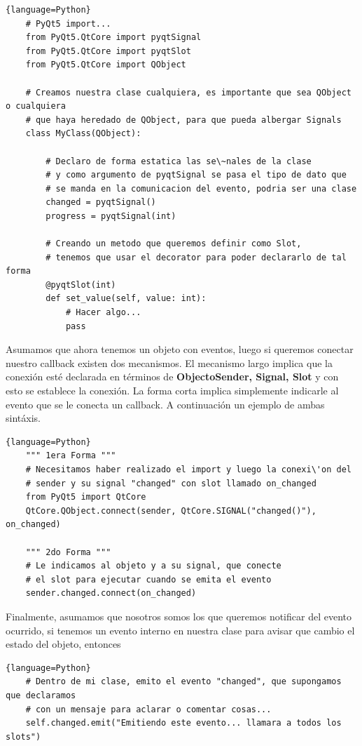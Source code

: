 \begin{lstlisting}{language=Python}
    # PyQt5 import...
    from PyQt5.QtCore import pyqtSignal
    from PyQt5.QtCore import pyqtSlot
    from PyQt5.QtCore import QObject

    # Creamos nuestra clase cualquiera, es importante que sea QObject o cualquiera
    # que haya heredado de QObject, para que pueda albergar Signals
    class MyClass(QObject):

        # Declaro de forma estatica las se\~nales de la clase
        # y como argumento de pyqtSignal se pasa el tipo de dato que
        # se manda en la comunicacion del evento, podria ser una clase
        changed = pyqtSignal()
        progress = pyqtSignal(int)

        # Creando un metodo que queremos definir como Slot,
        # tenemos que usar el decorator para poder declararlo de tal forma
        @pyqtSlot(int)
        def set_value(self, value: int):
            # Hacer algo...
            pass
\end{lstlisting}

Asumamos que ahora tenemos un objeto con eventos, luego si queremos conectar nuestro callback existen dos mecanismos. El mecanismo largo implica
que la conexi\'on est\'e declarada en t\'erminos de \textbf{ObjectoSender, Signal, Slot} y con esto se establece la conexi\'on. La forma corta implica simplemente indicarle al evento
que se le conecta un callback. A continuaci\'on un ejemplo de ambas sint\'axis.

\begin{lstlisting}{language=Python}
    """ 1era Forma """
    # Necesitamos haber realizado el import y luego la conexi\'on del
    # sender y su signal "changed" con slot llamado on_changed
    from PyQt5 import QtCore
    QtCore.QObject.connect(sender, QtCore.SIGNAL("changed()"), on_changed)

    """ 2do Forma """
    # Le indicamos al objeto y a su signal, que conecte
    # el slot para ejecutar cuando se emita el evento
    sender.changed.connect(on_changed)
\end{lstlisting}


Finalmente, asumamos que nosotros somos los que queremos notificar del evento ocurrido, si tenemos
un evento interno en nuestra clase para avisar que cambio el estado del objeto, entonces
\begin{lstlisting}{language=Python}
    # Dentro de mi clase, emito el evento "changed", que supongamos que declaramos
    # con un mensaje para aclarar o comentar cosas...
    self.changed.emit("Emitiendo este evento... llamara a todos los slots")
\end{lstlisting}

